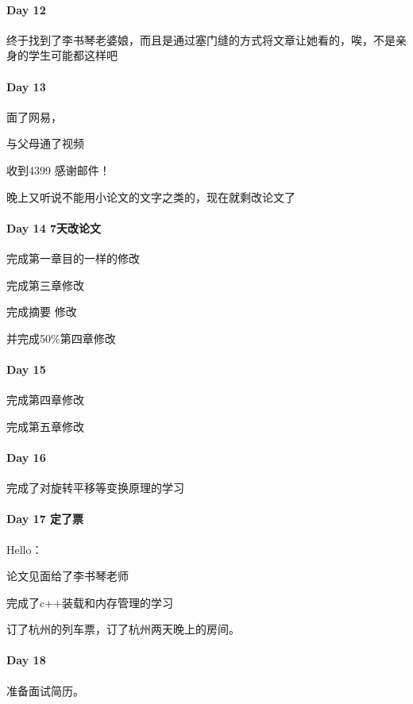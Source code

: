 \documentclass[UTF8,a4paper,8pt]{ctexart}
\begin{document}
 	 \paragraph{Day 12      \quad     }
	 	 终于找到了李书琴老婆娘，而且是通过塞门缝的方式将文章让她看的，唉，不是亲身的学生可能都这样吧
	 	 
	 	 
 	 \paragraph{Day 13      \quad     }
	 	 面了网易， 
	 	 
	 	 与父母通了视频
	 	 
	 	 收到4399 感谢邮件！
	 	 
	 	 晚上又听说不能用小论文的文字之类的，现在就剩改论文了
	 	 
 	 \paragraph{Day 14  7天改论文    \quad     }
	 	 完成第一章目的一样的修改
 	 
	 	 完成第三章修改
	 	 
	 	 完成摘要 修改
	 	 
	 	 并完成50\%第四章修改
	 	 
 	 \paragraph{Day 15      \quad     }
	 	 完成第四章修改
	 	 
	 	 完成第五章修改
	 	 
 	 \paragraph{Day 16      \quad     }
	 	 完成了对旋转平移等变换原理的学习
	 	 
 	 \paragraph{Day 17  定了票    \quad     }
	 	 Hello：
	 	 
	 	 论文见面给了李书琴老师
	 	 
	 	 完成了c++装载和内存管理的学习
	 	 
	 	 订了杭州的列车票，订了杭州两天晚上的房间。
	 	 
 	 \paragraph{Day 18      \quad     }
	 	 准备面试简历。
	 	 
\end{document}
